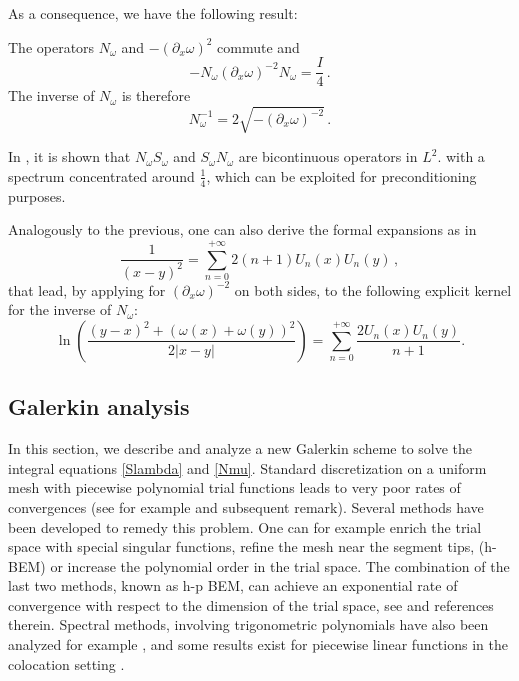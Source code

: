 \documentclass[a4paper]{article}
\begin{document}
	\noindent As a consequence, we have the following result:
	\begin{The} The operators $N_\omega$ and $-(\partial_x \omega)^2$ commute and 
		\[-N_\omega (\partial_x \omega)^{-2} N_{\omega} = \frac{I}{4}\,.\]
		The inverse of $N_\omega$ is therefore 
		\begin{equation}
		N_\omega^{-1} = 2\sqrt{-(\partial_x \omega)^{-2}}\,.
		\end{equation}
	\end{The}
	

	
	In \cite{bruno2012second}, it is shown that $N_\omega S_\omega$ and $S_\omega N_\omega$ are bicontinuous operators in $L^2$. with a spectrum concentrated around $\frac{1}{4}$, which can be exploited for preconditioning purposes. 
	
	Analogously to the previous, one can also derive the formal expansions as in \cite{jerez2012explicit}
	\[\frac{1}{(x-y)^2} = \sum_{n=0}^{+\infty} 2(n+1)U_n(x)U_n(y)\,,\]
	that lead, by applying for $(\partial_x\omega)^{-2}$ on both sides, to the following explicit kernel for the inverse of $N_\omega$:
	\[\ln\left(\dfrac{(y-x)^2 + (\omega(x) + \omega(y))^2}{2|x-y|}\right) = \sum_{n=0}^{+\infty} \dfrac{2 U_n(x) U_n(y)}{n+1}.\]
	
	
	\subsection{Galerkin analysis}
	
	
	In this section, we describe and analyze a new Galerkin scheme to solve the integral equations \eqref{Slambda} and \eqref{Nmu}. Standard discretization on a uniform mesh with piecewise polynomial trial functions leads to very poor rates of convergences (see for example \cite[Chap. 4, ]{sauter2011boundary} and subsequent remark). Several methods have been developed to remedy this problem. One can for example enrich the trial space with special singular functions, refine the mesh near the segment tips, (h-BEM) or increase the polynomial order in the trial space. The combination of the last two methods, known as h-p BEM, can achieve an exponential rate of convergence with respect to the dimension of the trial space, see \cite{postell1990h} and references therein. Spectral methods, involving trigonometric polynomials have also been analyzed for example \cite{bruno2012second}, and some results exist for piecewise linear functions in the colocation setting \cite{costabel1988convergence}. 
	
\end{document}
